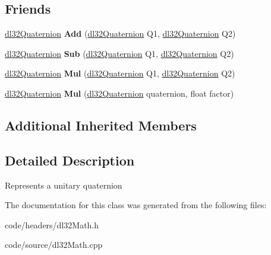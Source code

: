 \subsection*{Friends}
\begin{DoxyCompactItemize}
\item 
\hypertarget{classdl32_quaternion_ac0457430d6ddadf53f82da25de6b2e94}{\hyperlink{classdl32_quaternion}{dl32\-Quaternion} {\bfseries Add} (\hyperlink{classdl32_quaternion}{dl32\-Quaternion} Q1, \hyperlink{classdl32_quaternion}{dl32\-Quaternion} Q2)}\label{classdl32_quaternion_ac0457430d6ddadf53f82da25de6b2e94}

\item 
\hypertarget{classdl32_quaternion_a90617dd0e45443028f7c60b5a767a76a}{\hyperlink{classdl32_quaternion}{dl32\-Quaternion} {\bfseries Sub} (\hyperlink{classdl32_quaternion}{dl32\-Quaternion} Q1, \hyperlink{classdl32_quaternion}{dl32\-Quaternion} Q2)}\label{classdl32_quaternion_a90617dd0e45443028f7c60b5a767a76a}

\item 
\hypertarget{classdl32_quaternion_a9d7df8070a9ef9cf06502673e8fb8cc7}{\hyperlink{classdl32_quaternion}{dl32\-Quaternion} {\bfseries Mul} (\hyperlink{classdl32_quaternion}{dl32\-Quaternion} Q1, \hyperlink{classdl32_quaternion}{dl32\-Quaternion} Q2)}\label{classdl32_quaternion_a9d7df8070a9ef9cf06502673e8fb8cc7}

\item 
\hypertarget{classdl32_quaternion_a81e4e89018fe89f67f3a31f2843dd80c}{\hyperlink{classdl32_quaternion}{dl32\-Quaternion} {\bfseries Mul} (\hyperlink{classdl32_quaternion}{dl32\-Quaternion} quaternion, float factor)}\label{classdl32_quaternion_a81e4e89018fe89f67f3a31f2843dd80c}

\end{DoxyCompactItemize}
\subsection*{Additional Inherited Members}


\subsection{Detailed Description}
Represents a unitary quaternion 

The documentation for this class was generated from the following files\-:\begin{DoxyCompactItemize}
\item 
code/headers/dl32\-Math.\-h\item 
code/source/dl32\-Math.\-cpp\end{DoxyCompactItemize}
